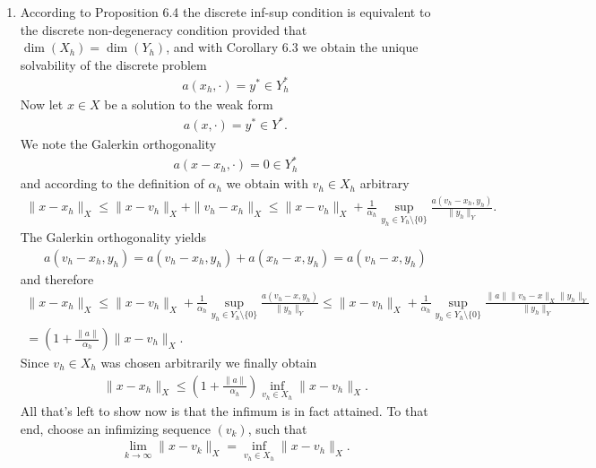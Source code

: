 \begin{solution}

\phantom{}

\begin{enumerate}[label = \textbf{\alph*)}]
  \item According to Proposition 6.4 the discrete inf-sup condition is equivalent to
  the discrete non-degeneracy condition provided that $\dim(X_h) = \dim(Y_h)$, and
  with Corollary 6.3 we obtain the unique solvability of the discrete problem
  \begin{align*}
    a(x_h,\cdot) = y^* \in Y_h^*
  \end{align*}
  Now let $x \in X$ be a solution to the weak form
  \begin{align*}
    a(x,\cdot) = y^* \in Y^*.
  \end{align*}
  We note the Galerkin orthogonality
  \begin{align*}
    a(x-x_h,\cdot) = 0 \in Y_h^*
  \end{align*}
  and according to the definition of $\alpha_h$ we obtain with $v_h \in X_h$ arbitrary
  \begin{align*}
    \|x-x_h\|_X \leq \|x- v_h\|_X + \|v_h-x_h\|_X
    \leq \|x- v_h\|_X + \frac{1}{\alpha_h}\sup_{y_h \in Y_h\setminus \{0\}}\frac{a(v_h-x_h,y_h)}{\|y_h\|_Y}.
  \end{align*}
  The Galerkin orthogonality yields
  \begin{align*}
    a(v_h-x_h,y_h) = a(v_h-x_h,y_h) + a(x_h - x,y_h) = a(v_h - x,y_h)
  \end{align*}
  and therefore
  \begin{align*}
    \|x-x_h\|_X \leq \|x- v_h\|_X + \frac{1}{\alpha_h}\sup_{y_h \in Y_h\setminus \{0\}}\frac{a(v_h-x,y_h)}{\|y_h\|_Y}
    \leq  \|x- v_h\|_X + \frac{1}{\alpha_h}\sup_{y_h \in Y_h\setminus \{0\}}\frac{\|a\|
    \|v_h-x\|_X\|y_h\|_Y}{\|y_h\|_Y} \\
    = \left(1 + \frac{\|a\|}{\alpha_h}\right)\|x- v_h\|_X.
  \end{align*}
  Since $v_h \in X_h$ was chosen arbitrarily we finally obtain
  \begin{align*}
    \|x-x_h\|_X \leq \left(1 + \frac{\|a\|}{\alpha_h}\right)\inf_{v_h \in X_h}\|x - v_h\|_X.
  \end{align*}
  All that's left to show now is that the infimum is in fact attained.
  To that end, choose an infimizing sequence $(v_k)$, such that
  \begin{align*}
    \lim_{k \to \infty}\|x - v_k\|_X = \inf_{v_h \in X_h}\|x- v_h\|_X.

\end{align*}
\end{enumerate}
\end{solution}
